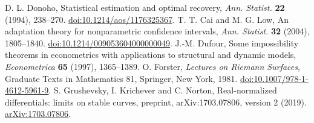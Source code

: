 D. L. Donoho, Statistical estimation and optimal recovery,
\emph{Ann. Statist.} \textbf{22} (1994), 238--270.
\href{https://doi.org/10.1214/aos/1176325367}{doi:10.1214/aos/1176325367}.
T. T. Cai and M. G. Low, An adaptation theory for nonparametric confidence intervals,
\emph{Ann. Statist.} \textbf{32} (2004), 1805--1840.
\href{https://doi.org/10.1214/009053604000000049}{doi:10.1214/009053604000000049}.
J.-M. Dufour, Some impossibility theorems in econometrics with applications
to structural and dynamic models,
\emph{Econometrica} \textbf{65} (1997), 1365--1389.
O. Forster, \emph{Lectures on Riemann Surfaces},
Graduate Texts in Mathematics 81, Springer, New York, 1981.
\href{https://doi.org/10.1007/978-1-4612-5961-9}{doi:10.1007/978-1-4612-5961-9}.
S. Grushevsky, I. Krichever and C. Norton,
Real-normalized differentials: limits on stable curves,
preprint, arXiv:1703.07806, version 2 (2019).
\href{https://arxiv.org/abs/1703.07806}{arXiv:1703.07806}.
